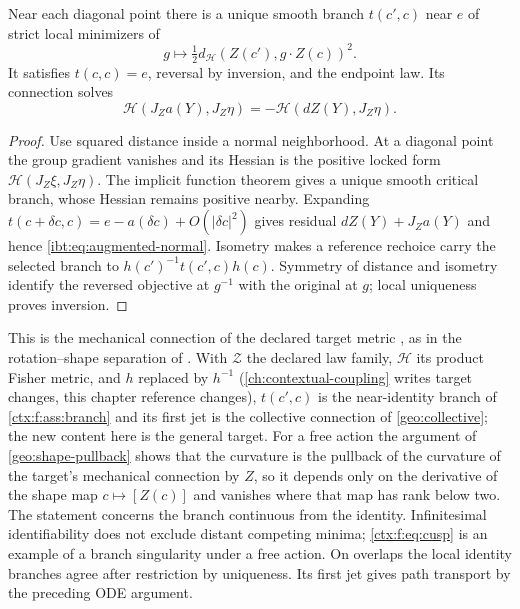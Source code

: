 Near each diagonal point there is a unique smooth branch $t(c',c)$ near $e$ of strict local minimizers of
\begin{equation}
 g\longmapsto\tfrac12 d_{\mathcal H}(Z(c'),g\cdot Z(c))^2.
 \label{ibt:eq:alignment}
\end{equation}
It satisfies $t(c,c)=e$, reversal by inversion, and the endpoint law. Its connection solves
\begin{equation}
 \mathcal H(J_Za(Y),J_Z\eta)=-\mathcal H(d Z(Y),J_Z\eta).
 \label{ibt:eq:augmented-normal}
\end{equation}
\begin{proof}
Use squared distance inside a normal neighborhood. At a diagonal point the group gradient vanishes and its Hessian is the positive locked form $\mathcal H(J_Z\xi,J_Z\eta)$. The implicit function theorem gives a unique smooth critical branch, whose Hessian remains positive nearby. Expanding $t(c+\delta c,c)=e-a(\delta c)+O(|\delta c|^2)$ gives residual $d Z(Y)+J_Za(Y)$ and hence \cref{ibt:eq:augmented-normal}. Isometry makes a reference rechoice carry the selected branch to $h(c')^{-1}t(c',c)h(c)$. Symmetry of distance and isometry identify the reversed objective at $g^{-1}$ with the original at $g$; local uniqueness proves inversion.
\end{proof}

This is the mechanical connection of the declared target metric \citep{Smale1970}, as in the rotation--shape separation of \citet{LittlejohnReinsch1997}. With $\mathcal Z$ the declared law family, $\mathcal H$ its product Fisher metric, and $h$ replaced by $h^{-1}$ (\cref{ch:contextual-coupling} writes target changes, this chapter reference changes), $t(c',c)$ is the near-identity branch of \cref{ctx:f:ass:branch} and its first jet is the collective connection of \cref{geo:collective}; the new content here is the general target. For a free action the argument of \cref{geo:shape-pullback} shows that the curvature is the pullback of the curvature of the target's mechanical connection by $Z$, so it depends only on the derivative of the shape map $c\mapsto[Z(c)]$ and vanishes where that map has rank below two. The statement concerns the branch continuous from the identity. Infinitesimal identifiability does not exclude distant competing minima; \cref{ctx:f:eq:cusp} is an example of a branch singularity under a free action. On overlaps the local identity branches agree after restriction by uniqueness. Its first jet gives path transport by the preceding ODE argument.

